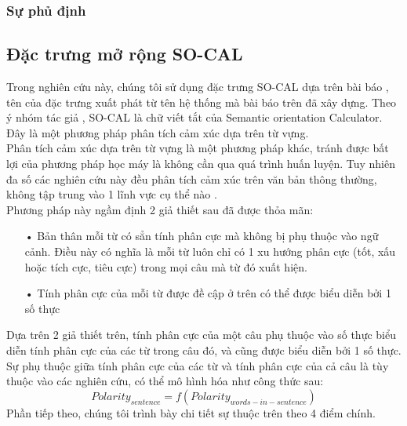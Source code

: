 \subsubsection*{Sự phủ định}
\subsection{Đặc trưng mở rộng SO-CAL}
Trong nghiên cứu này, chúng tôi sử dụng đặc trưng SO-CAL dựa trên bài báo \cite{taboada2011lexicon}, tên của đặc trưng xuất phát từ tên hệ thống mà bài báo trên đã xây dựng. Theo ý nhóm tác giả \cite{taboada2011lexicon}, SO-CAL là chữ viết tắt của Semantic orientation Calculator. Đây là một phương pháp phân tích cảm xúc dựa trên từ vựng.\\

Phân tích cảm xúc dựa trên từ vựng là một phương pháp khác, tránh được bất lợi của phương pháp học máy là không cần qua quá trình huấn luyện. Tuy nhiên đa số các nghiên cứu này đều phân tích cảm xúc trên văn bản thông thường, không tập trung vào 1 lĩnh vực cụ thể nào \cite{taboada2011lexicon}\cite{Zhang2011}\cite{ohana2009sentiment}\cite{Giachanou2016}. \\

Phương pháp này ngầm định 2 giả thiết sau đã được thỏa mãn:
\begin{itemize}
\item[•] Bản thân mỗi từ có sẳn tính phân cực mà không bị phụ thuộc vào ngữ cảnh. Điều này có nghĩa là mỗi từ luôn chỉ có 1 xu hướng phân cực (tốt, xấu hoặc tích cực, tiêu cực) trong mọi câu mà từ đó xuất hiện.
\item[•] Tính phân cực của mỗi từ được đề cập ở trên có thể được biểu diễn bởi 1 số thực
\end{itemize}
Dựa trên 2 giả thiết trên, tính phân cực của một câu phụ thuộc vào số thực biểu diễn tính phân cực của các từ trong câu đó, và cũng được biểu diễn bởi 1 số thực. Sự phụ thuộc giữa tính phân cực của các từ và tính phân cực của cả câu là tùy thuộc vào các nghiên cứu, có thể mô hình hóa như công thức sau:
\begin{equation}
Polarity_{sentence}=f(Polarity_{words-in-sentence})
\end{equation}
Phần tiếp theo, chúng tôi trình bày chi tiết sự thuộc trên theo 4 điểm chính.\\
